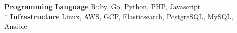 
\begin{cvparagraph}

  \begin{nospacetabbing}
  \textbf{Programming Language}  \= Ruby, Go, Python, PHP, Javascript\\*
  \textbf{Infrastructure}  \= Linux, AWS, GCP, Elasticsearch, PostgreSQL, MySQL, Ansible
  \end{nospacetabbing}

\end{cvparagraph}
